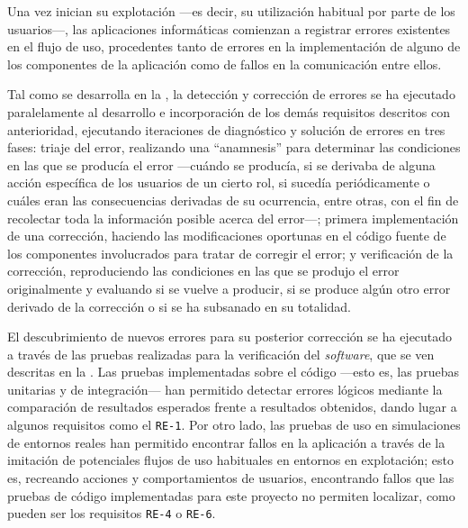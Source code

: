 Una vez inician su explotación ---es decir, su utilización habitual por parte de los usuarios---, las aplicaciones informáticas comienzan a registrar errores existentes en el flujo de uso, procedentes tanto de errores en la implementación de alguno de los componentes de la aplicación como de fallos en la comunicación entre ellos.

Tal como se desarrolla en la , la detección y corrección de errores se ha ejecutado paralelamente al desarrollo e incorporación de los demás requisitos descritos con anterioridad, ejecutando iteraciones de diagnóstico y solución de errores en tres fases: triaje del error, realizando una ``anamnesis'' para determinar las condiciones en las que se producía el error ---cuándo se producía, si se derivaba de alguna acción específica de los usuarios de un cierto rol, si sucedía periódicamente o cuáles eran las consecuencias derivadas de su ocurrencia, entre otras, con el fin de recolectar toda la información posible acerca del error---; primera implementación de una corrección, haciendo las modificaciones oportunas en el código fuente de los componentes involucrados para tratar de corregir el error; y verificación de la corrección, reproduciendo las condiciones en las que se produjo el error originalmente y evaluando si se vuelve a producir, si se produce algún otro error derivado de la corrección o si se ha subsanado en su totalidad.

El descubrimiento de nuevos errores para su posterior corrección se ha ejecutado a través de las pruebas realizadas para la verificación del \textit{software}, que se ven descritas en la . Las pruebas implementadas sobre el código ---esto es, las pruebas unitarias y de integración--- han permitido detectar errores lógicos mediante la comparación de resultados esperados frente a resultados obtenidos, dando lugar a algunos requisitos como el \texttt{RE-1}.
Por otro lado, las pruebas de uso en simulaciones de entornos reales han permitido encontrar fallos en la aplicación a través de la imitación de potenciales flujos de uso habituales en entornos en explotación; esto es, recreando acciones y comportamientos de usuarios, encontrando fallos que las pruebas de código implementadas para este proyecto no permiten localizar, como pueden ser los requisitos \texttt{RE-4} o \texttt{RE-6}.

